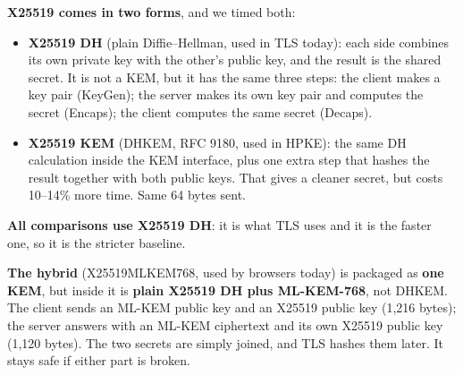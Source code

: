 \documentclass[10pt,a4paper]{article}
\newcommand{\key}[1]{\textbf{#1}}
\begin{document}
\textbf{X25519 comes in two forms}, and we timed both:
\begin{itemize}
\item \key{X25519 DH} (plain Diffie--Hellman, used in TLS today): each side combines its own private key with the other's public key, and the result is the shared secret. It is not a KEM, but it has the same three steps: the client makes a key pair (KeyGen); the server makes its own key pair and computes the secret (Encaps); the client computes the same secret (Decaps).
\item \key{X25519 KEM} (DHKEM, RFC 9180, used in HPKE): the same DH calculation inside the KEM interface, plus one extra step that hashes the result together with both public keys. That gives a cleaner secret, but costs 10--14\% more time. Same 64 bytes sent.
\end{itemize}
\key{All comparisons use X25519 DH}: it is what TLS uses and it is the faster one, so it is the stricter baseline.

\textbf{The hybrid} (X25519MLKEM768, used by browsers today) is packaged as \key{one KEM}, but inside it is \key{plain X25519 DH plus ML-KEM-768}, not DHKEM. The client sends an ML-KEM public key and an X25519 public key (1,216 bytes); the server answers with an ML-KEM ciphertext and its own X25519 public key (1,120 bytes). The two secrets are simply joined, and TLS hashes them later. It stays safe if either part is broken.
\end{document}
